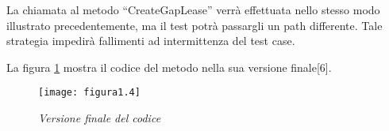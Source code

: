 La chiamata al metodo “CreateGapLease” verrà effettuata nello stesso modo illustrato precedentemente, ma il test potrà passargli un path differente. Tale strategia impedirà fallimenti ad intermittenza del test case.

La figura \ref{fig:fig.1.4} mostra il codice del metodo nella sua versione finale[6].
\begin{figure}[h!]
	\centering
	\texttt{[image: figura1.4]}
	\caption{\emph{Versione finale del codice}}
	\label{fig:fig.1.4}
\end{figure}